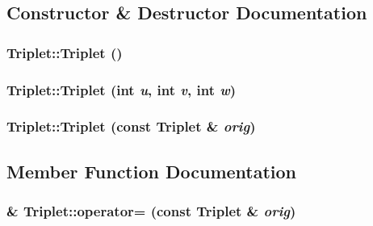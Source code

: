\subsection{Constructor \& Destructor Documentation}
\hypertarget{structTriplet_ae4f7691a592a571ae6f5aaaa4fc953f3}{
\subsubsection[{Triplet}]{\setlength{\rightskip}{0pt plus 5cm}Triplet::Triplet ()}}
\label{structTriplet_ae4f7691a592a571ae6f5aaaa4fc953f3}
\hypertarget{structTriplet_a70457ef6a05b29f73ebcd8f9270797e3}{
\subsubsection[{Triplet}]{\setlength{\rightskip}{0pt plus 5cm}Triplet::Triplet (int {\em u}, \/  int {\em v}, \/  int {\em w})}}
\label{structTriplet_a70457ef6a05b29f73ebcd8f9270797e3}
\hypertarget{structTriplet_aa6d4bab5cc79da13ed8ac1797b116838}{
\subsubsection[{Triplet}]{\setlength{\rightskip}{0pt plus 5cm}Triplet::Triplet (const {\bf Triplet} \& {\em orig})}}
\label{structTriplet_aa6d4bab5cc79da13ed8ac1797b116838}


\subsection{Member Function Documentation}
\hypertarget{structTriplet_a39e9b4fa3119643737509863defa67ce}{
\subsubsection[{operator=}]{\& Triplet::operator= (const {\bf Triplet} \& {\em orig})}}
\label{structTriplet_a39e9b4fa3119643737509863defa67ce}


